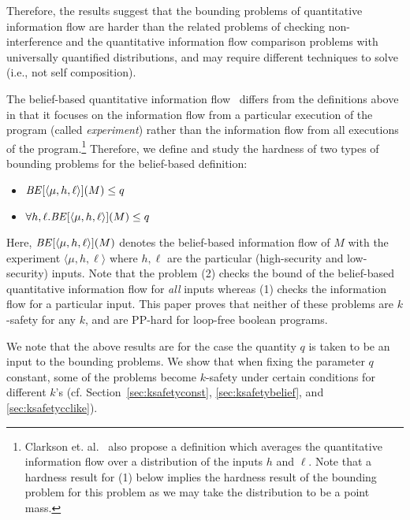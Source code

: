 \documentclass{llncs}
\newcommand{\aseq}[1]{\langle#1\rangle}
\begin{document}
Therefore, the results suggest that the bounding problems of
quantitative information flow are harder than the related problems of
checking non-interference and the quantitative information flow
comparison problems with universally quantified distributions, and may
require different techniques to solve (i.e., not self composition).

The belief-based quantitative information flow~\cite{clarkson:csf2005}
differs from the definitions above in that it focuses on the
information flow from a particular execution of the program (called
{\em experiment}) rather than the information flow from all executions
of the program.\footnote{Clarkson et. al.~\cite{clarkson:csf2005}
    also propose a definition which averages the quantitative
    information flow over a distribution of the inputs $h$ and $\ell$.
    Note that a hardness result for (1) below implies the hardness
    result of the bounding problem for this problem as we may take the
    distribution to be a point mass.}  Therefore, we define and study
the hardness of two types of bounding problems for the belief-based
definition:
\begin{itemize}
\item[(1)] ${\it BE}[\aseq{\mu,h,\ell}](M)\le q$
\item[(2)] $\forall h,\ell.{\it BE}[\aseq{\mu,h,\ell}](M)\le q$
\end{itemize}
Here, ${\it BE}[\aseq{\mu,h,\ell}](M)$ denotes the belief-based
information flow of $M$ with the experiment $\aseq{\mu,h,\ell}$ where
$h,\ell$ are the particular (high-security and low-security) inputs.
Note that the problem (2) checks the bound of the belief-based
quantitative information flow for {\em all} inputs whereas (1) checks
the information flow for a particular input.  This paper proves that
neither of these problems are $k$-safety for any $k$, and are PP-hard
for loop-free boolean programs.

We note that the above results are for the case the quantity $q$ is
taken to be an input to the bounding problems.  We show that when
fixing the parameter $q$ constant, some of the problems become
$k$-safety under certain conditions for different $k$'s
(cf. Section~\ref{sec:ksafetyconst}, \ref{sec:ksafetybelief}, and
\ref{sec:ksafetycclike}).
\end{document}
